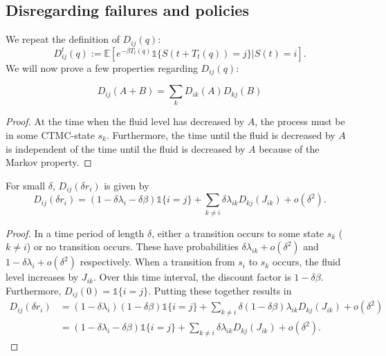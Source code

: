 \subsection{Disregarding failures and policies}
We repeat the definition of $D_{ij}(q)$:
\[
D_{ij}^t(q):=\mathbb{E}[e^{-\beta T_t(q)}\mathds{1}\{S(t+T_t(q))=j\}|S(t)=i].
\]
We will now prove a few properties regarding $D_{ij}(q)$:
\begin{lemma}\label{lemma:MmfmDiscountsExponentLinear}
	\[
	D_{ij}(A+B)=\sum\limits_k D_{ik}(A)D_{kj}(B)
	\]
	\begin{proof}
		At the time when the fluid level has decreased by $A$, the process must be in some CTMC-state $s_k$.
		Furthermore, the time until the fluid is decreased by $A$ is independent of the time until the fluid is decreased by $A$ because of the Markov property.
	\end{proof}
\end{lemma}
\begin{lemma}\label{lemma:MmfmDiscountsInfinitisimal}
	For small $\delta$, $D_{ij}(\delta r_i)$ is given by
	\[
	D_{ij}(\delta r_i)=(1-\delta\lambda_i-\delta\beta)\mathds{1}\{i=j\}+\sum\limits_{k\neq i}\delta\lambda_{ik}D_{kj}(J_{ik})+o(\delta^2).
	\]
	\begin{proof}
		In a time period of length $\delta$, either a transition occurs to some state $s_k$ ($k\neq i$) or no transition occurs.
		These have probabilities $\delta\lambda_{ik}+o(\delta^2)$ and $1-\delta\lambda_i+o(\delta^2)$ respectively.
		When a transition from $s_i$ to $s_k$ occurs, the fluid level increases by $J_{ik}$.
		Over this time interval, the discount factor is $1-\delta\beta$.
		Furthermore, $D_{ij}(0)=\mathds{1}\{i=j\}$.
		Putting these together results in
		\[
		\begin{split}
		D_{ij}(\delta r_i)&=(1-\delta\lambda_i)(1-\delta\beta)\mathds{1}\{i=j\}+\sum\limits_{k\neq i}\delta(1-\delta\beta)\lambda_{ik}D_{kj}(J_{ik})+o(\delta^2)\\
		&=(1-\delta\lambda_i-\delta\beta)\mathds{1}\{i=j\}+\sum\limits_{k\neq i}\delta\lambda_{ik}D_{kj}(J_{ik})+o(\delta^2).
		\end{split}
		\]
	\end{proof}
\end{lemma}
